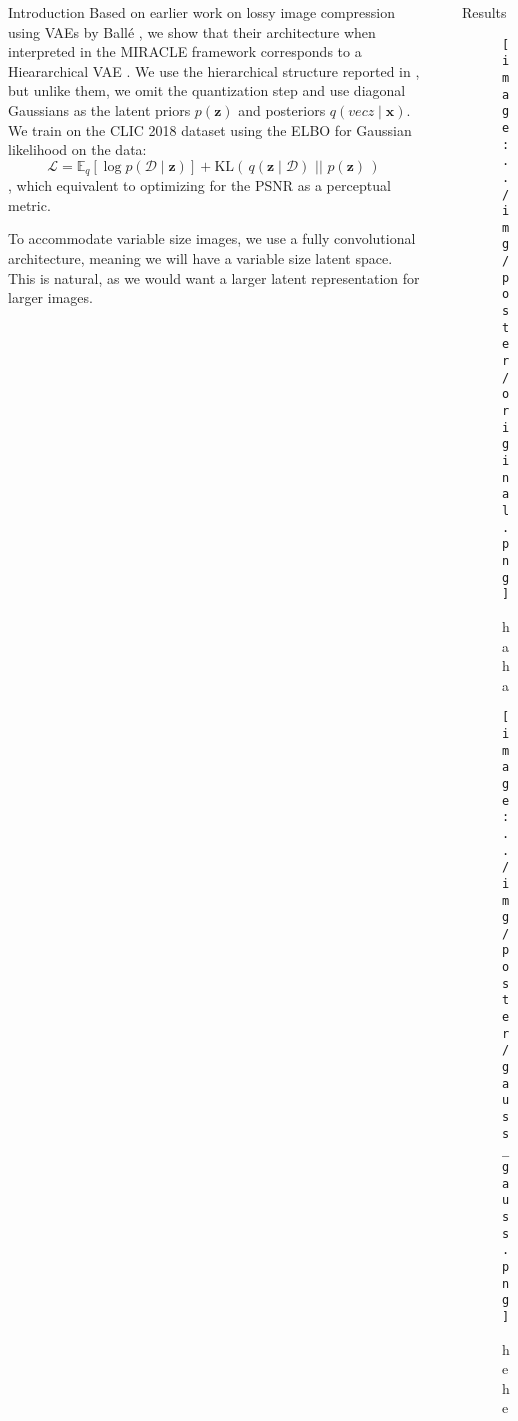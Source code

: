 \documentclass[final]{beamer}
\newlength{\sepwid}
\newlength{\onecolwid}
\newlength{\twocolwid}
\renewcommand{\vec}[1]{\mathbf{#1}}
\renewcommand{\L}{\mathcal{L}}
\newcommand{\D}{\mathcal{D}}
\newcommand{\Exp}{\mathbb{E}}
\newcommand{\KL}[2]{\mathrm{KL}\left(\,#1\,\,||\,\,#2\,\right)}
\begin{document}
\begin{frame}[t]
\begin{columns}[t]
\begin{column}{\onecolwid}
\begin{block}{Introduction}
Based on earlier work on lossy image compression using VAEs by Ball\'e
\cite{balle2018variational}, we show that their architecture when interpreted in
the MIRACLE framework corresponds to a Hieararchical VAE \cite{sonderby2016train}.
We use the hierarchical structure reported in \cite{balle2018variational}, but
unlike them, we omit the quantization step and use diagonal Gaussians as the
latent priors $p(\vec{z})$ and posteriors $q(vec{z} \mid \vec{x})$.
We train on the CLIC 2018 dataset \cite{clic2018} using the ELBO for Gaussian
likelihood on the data:
\begin{equation}
  \L = \Exp_q[\log p(\D \mid \vec{z})] + \KL{q(\vec{z} \mid \D)}{p(\vec{z})}
\end{equation}
, which equivalent
to optimizing for the PSNR \cite{psnr} as a perceptual metric. 

\noindent
To accommodate variable size images, we use a fully convolutional
architecture, meaning we will have a variable size latent space. This is
natural, as we would want a larger latent representation for larger images.

\end{block}


\end{column} %

\begin{column}{\sepwid}\end{column} %

\begin{column}{\twocolwid} %


\begin{block}{Results}

\begin{figure}
\centering
\begin{minipage}[t]{.47\textwidth}
  \centering
  \texttt{[image: ../img/poster/original.png]} 
  \caption{haha}
  \label{fig:original_tattoo}
\end{minipage}%
\hfill
\begin{minipage}[t]{.47\textwidth}
  \centering
  \texttt{[image: ../img/poster/gauss\_gauss.png]}
  \caption{hehe}  
  \label{fig:reconstructed_tattoo}
\end{minipage}
\end{figure}


\end{block}
\end{column}
\end{columns}
\end{frame}
\end{document}
